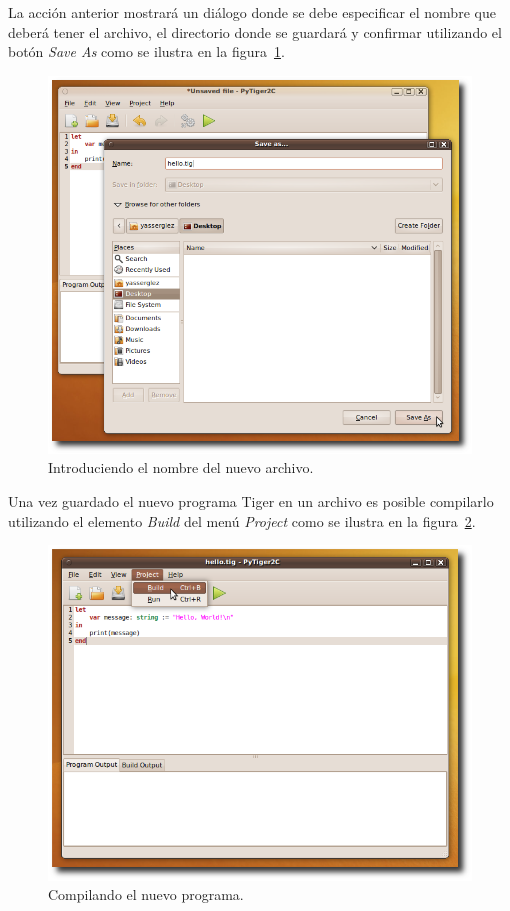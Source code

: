 \documentclass{article}
\begin{document}
\newpage

La acción anterior mostrará un diálogo donde se debe especificar el nombre que
deberá tener el archivo, el directorio donde se guardará  y confirmar utilizando
el botón \emph{Save As} como se ilustra en la figura~\ref{fig:4-save-as}.

\begin{figure}[htb]
  \centering
  \includegraphics[width=6in]{gui/4-save-as}
  \caption{Introduciendo el nombre del nuevo archivo.}
  \label{fig:4-save-as}
\end{figure}

\newpage

Una vez guardado el nuevo programa Tiger en un archivo es posible compilarlo
utilizando el elemento \emph{Build} del menú \emph{Project} como se ilustra
en la figura~\ref{fig:5-building}.

\begin{figure}[htb]
  \centering
  \includegraphics[width=5.5in]{gui/5-building}
  \caption{Compilando el nuevo programa.}
  \label{fig:5-building}
\end{figure}
\end{document}
